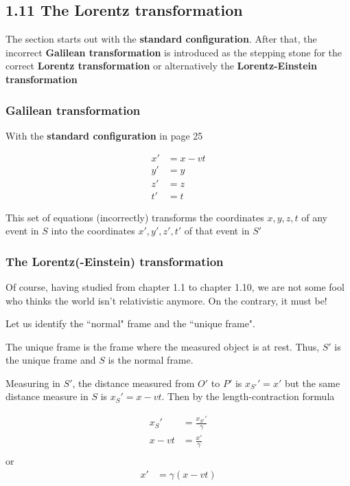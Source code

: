 \subsection{1.11 The Lorentz transformation}

The section starts out with the \textbf{standard configuration}. After that, the incorrect \textbf{Galilean transformation} is introduced as the stepping stone for the correct \textbf{Lorentz transformation} or alternatively the \textbf{Lorentz-Einstein transformation}

\subsubsection{Galilean transformation}

With the \textbf{standard configuration} in page 25

\begin{equation*}
    \begin{aligned}
        x' &= x - vt \\
        y' &= y \\
        z' &= z \\
        t' &= t
    \end{aligned}
\end{equation*}

This set of equations (incorrectly) transforms the coordinates $x,y,z,t$ of any event in $S$ into the coordinates $x', y', z', t'$ of that event in $S'$

\subsubsection{The Lorentz(-Einstein) transformation}

Of course, having studied from chapter 1.1 to chapter 1.10, we are not some fool who thinks the world isn't relativistic anymore. On the contrary, it must be!

Let us identify the ``normal" frame and the ``unique frame".

The unique frame is the frame where the measured object is at rest. Thus, $S'$ is the unique frame and $S$ is the normal frame.

Measuring in $S'$, the distance measured from $O'$ to $P'$ is $x_{S'}' = x'$ but the same distance measure in $S$ is $x_{S}'= x - vt$. Then by the length-contraction formula

\begin{align*}
    x_{S}' &= \frac{x_{S'}'}{\gamma} \\
    x - vt &= \frac{x'}{\gamma} \\
\end{align*}
or 
\begin{align*}
    x' &= \gamma (x - vt)
\end{align*}

